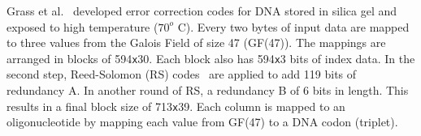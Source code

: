 \documentclass{bioinfo}
\begin{document}
Grass et al.~\cite{GRASS2015} developed error correction codes for DNA stored in silica gel and exposed to high temperature ($70^o$ C). Every two bytes of input data are mapped to three values from the Galois Field of size 47 (GF(47)). The mappings are arranged in blocks of 594\texttt{x}30. Each block also has 594\texttt{x}3 bits of index data. In the second step, Reed-Solomon (RS) codes~\cite{REED1960} are applied to add 119 bits of redundancy A. In another round of RS, a redundancy B of 6 bits in length. This results in a final block size of 713\texttt{x}39. Each column is mapped to an oligonucleotide by mapping each value from GF(47) to a DNA codon (triplet).

\begin{table}[t]
	\caption{Codon to Amino Acid Mapping}
	\label{fig:table1}
\end{table}
\end{document}
